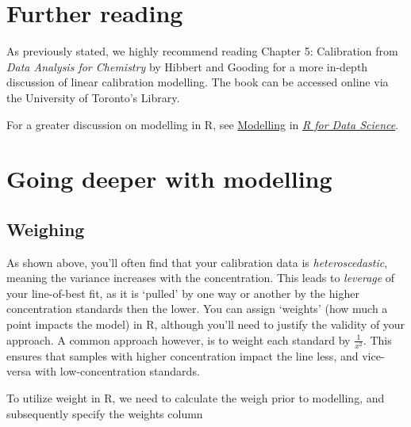 \documentclass[
]{book}
\begin{document}
\hypertarget{further-reading-6}{%
\section{Further reading}\label{further-reading-6}}

As previously stated, we highly recommend reading Chapter 5: Calibration from \emph{Data Analysis for Chemistry} by Hibbert and Gooding for a more in-depth discussion of linear calibration modelling. The book can be accessed online via the University of Toronto's Library.

For a greater discussion on modelling in R, see \href{https://r4ds.had.co.nz/model-intro.html}{Modelling} in \href{https://r4ds.had.co.nz/index.html}{\emph{R for Data Science}}.

\hypertarget{going-deeper-with-modelling}{%
\section{Going deeper with modelling}\label{going-deeper-with-modelling}}

\hypertarget{weighing}{%
\subsection{Weighing}\label{weighing}}

As shown above, you'll often find that your calibration data is \emph{heteroscedastic}, meaning the variance increases with the concentration. This leads to \emph{leverage} of your line-of-best fit, as it is `pulled' by one way or another by the higher concentration standards then the lower. You can assign `weights' (how much a point impacts the model) in R, although you'll need to justify the validity of your approach. A common approach however, is to weight each standard by \(\frac{1}{x^2}\). This ensures that samples with higher concentration impact the line less, and vice-versa with low-concentration standards.

To utilize weight in R, we need to calculate the weigh prior to modelling, and subsequently specify the weights column
\end{document}
